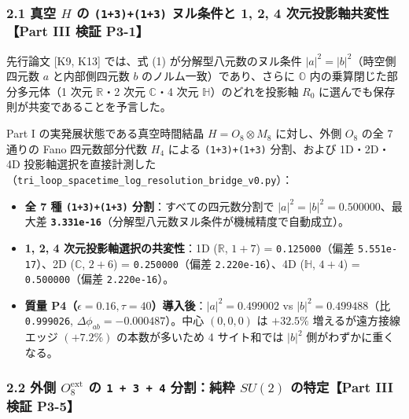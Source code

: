 \documentclass[
  a4paper,
]{ltjsarticle}
\providecommand{\tightlist}{%
  \setlength{\itemsep}{0pt}\setlength{\parskip}{0pt}}
\begin{document}
\subsubsection{\texorpdfstring{2.1 真空 \(H\) の \texttt{(1+3)+(1+3)}
ヌル条件と 1, 2, 4 次元投影軸共変性【Part III 検証
P3-1】}{2.1 真空 H の (1+3)+(1+3) ヌル条件と 1, 2, 4 次元投影軸共変性【Part III 検証 P3-1】}}\label{ux771fux7a7a-h-ux306e-1313-ux30ccux30ebux6761ux4ef6ux3068-1-2-4-ux6b21ux5143ux6295ux5f71ux8ef8ux5171ux5909ux6027part-iii-ux691cux8a3c-p3-1}

先行論文 {[}K9, K13{]} では、式 (1) が分解型八元数のヌル条件
\(|a|^2 = |b|^2\)（時空側四元数 \(a\) と内部側四元数 \(b\)
のノルム一致）であり、さらに \(\mathbb{O}\) 内の乗算閉じた部分多元体（1
次元 \(\mathbb{R}\)・2 次元 \(\mathbb{C}\)・4 次元
\(\mathbb{H}\)）のどれを投影軸 \(R_0\)
に選んでも保存則が共変であることを予言した。

Part I の実発展状態である真空時間結晶 \(H = O_8 \otimes M_8\)
に対し、外側 \(O_8\) の全 7 通りの Fano 四元数部分代数 \(H_4\) による
\texttt{(1+3)+(1+3)} 分割、および 1D・2D・4D
投影軸選択を直接計測した（\texttt{tri\_loop\_spacetime\_log\_resolution\_bridge\_v0.py}）：

\begin{itemize}
\tightlist
\item
  \textbf{全 7 種 \texttt{(1+3)+(1+3)} 分割}：すべての四元数分割で
  \(|a|^2 = |b|^2 = 0.500000\)、最大差
  \textbf{\texttt{3.331e-16}}（分解型八元数ヌル条件が機械精度で自動成立）。
\item
  \textbf{1, 2, 4 次元投影軸選択の共変性}：1D (\(\mathbb{R}\), \(1+7\))
  = \texttt{0.125000}（偏差 \texttt{5.551e-17}）、2D (\(\mathbb{C}\),
  \(2+6\)) = \texttt{0.250000}（偏差 \texttt{2.220e-16}）、4D
  (\(\mathbb{H}\), \(4+4\)) = \texttt{0.500000}（偏差
  \texttt{2.220e-16}）。
\item
  \textbf{質量
  P4（\(\epsilon=0.16, \tau=40\)）導入後}：\(|a|^2 = 0.499002\) vs
  \(|b|^2 = 0.499488\)（比 \texttt{0.999026},
  \(\Delta\phi_{ab} = -0.000487\)）。中心 \((0,0,0)\) は \(+32.5\%\)
  増えるが遠方接線エッジ \((+7.2\%)\) の本数が多いため 4 サイト和では
  \(|b|^2\) 側がわずかに重くなる。
\end{itemize}

\subsubsection{\texorpdfstring{2.2 外側 \(O_8^{\mathrm{ext}}\) の
\texttt{1\ +\ 3\ +\ 4} 分割：純粋 \(SU(2)\) の特定【Part III 検証
P3-5】}{2.2 外側 O\_8\^{}\{\textbackslash mathrm\{ext\}\} の 1 + 3 + 4 分割：純粋 SU(2) の特定【Part III 検証 P3-5】}}\label{ux5916ux5074-o_8mathrmext-ux306e-1-3-4-ux5206ux5272ux7d14ux7c8b-su2-ux306eux7279ux5b9apart-iii-ux691cux8a3c-p3-5}
\end{document}
